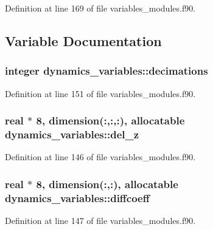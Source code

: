 Definition at line 169 of file variables\+\_\+modules.\+f90.



\subsection{Variable Documentation}
\subsubsection[{\texorpdfstring{decimations}{decimations}}]{\setlength{\rightskip}{0pt plus 5cm}integer dynamics\+\_\+variables\+::decimations}\hypertarget{namespacedynamics__variables_a779c965a5816a34b1bc10ea35aec740b}{}\label{namespacedynamics__variables_a779c965a5816a34b1bc10ea35aec740b}


Definition at line 151 of file variables\+\_\+modules.\+f90.

\subsubsection[{\texorpdfstring{del\+\_\+z}{del_z}}]{\setlength{\rightskip}{0pt plus 5cm}real $\ast$ 8, dimension(\+:,\+:,\+:), allocatable dynamics\+\_\+variables\+::del\+\_\+z}\hypertarget{namespacedynamics__variables_a7fbb51910c646d86285a6bdd809b09f0}{}\label{namespacedynamics__variables_a7fbb51910c646d86285a6bdd809b09f0}


Definition at line 146 of file variables\+\_\+modules.\+f90.

\subsubsection[{\texorpdfstring{diffcoeff}{diffcoeff}}]{\setlength{\rightskip}{0pt plus 5cm}real $\ast$ 8, dimension(\+:,\+:), allocatable dynamics\+\_\+variables\+::diffcoeff}\hypertarget{namespacedynamics__variables_a99c20709f211a88c64061031e4fb816f}{}\label{namespacedynamics__variables_a99c20709f211a88c64061031e4fb816f}


Definition at line 147 of file variables\+\_\+modules.\+f90.

